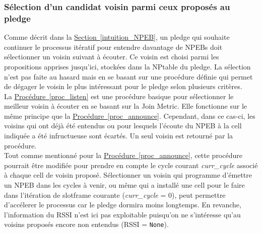 \documentclass[]{report}
\newcommand{\wordlink}[2]{\hyperref[#2]{#1~\ref{#2}}}
\begin{document}
\vspace{0.2cm}

\subsubsection{Sélection d'un candidat voisin parmi ceux proposés au pledge}

Comme décrit dans la \wordlink{Section}{intuition_NPEB}, un pledge qui souhaite continuer le processus itératif pour entendre davantage de NPEBs doit sélectionner un voisin suivant à écouter. Ce voisin est choisi parmi les propositions apprises jusqu'ici, stockées dans la NPtable du pledge. La sélection n'est pas faite au hasard mais en se basant sur une procédure  définie qui permet de dégager le voisin le plus intéressant pour le pledge selon plusieurs critères.\\

La \wordlink{Procédure}{proc_listen} est une procédure basique pour sélectionner le meilleur voisin à écouter en se basant sur la Join Metric. Elle fonctionne sur le même principe que la \wordlink{Procédure}{proc_announce}. Cependant, dans ce cas-ci, les voisins qui ont déjà été entendus ou pour lesquels l'écoute du NPEB à la cell indiquée a été infructueuse sont écartés. Un seul voisin est retourné par la procédure.\\

Tout comme mentionné pour la \wordlink{Procédure}{proc_announce}, cette procédure pourrait être modifiée pour prendre en compte le cycle courant \textit{curr\_cycle} associé à chaque cell de voisin proposé. Sélectionner un voisin qui programme d'émettre un NPEB dans les cycles à venir, ou même qui a installé une cell pour le faire dans l'itération de slotframe courante (\textit{curr\_cycle} = 0), peut permettre d'accélerer le processus car le pledge dormira moins longtemps. En revanche, l'information du RSSI n'est ici pas exploitable puisqu'on ne s'intéresse qu'au voisins proposés encore non entendus (RSSI = \texttt{None}).

\newpage
\end{document}
